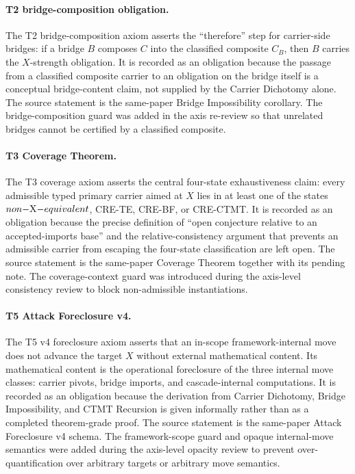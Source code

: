 \documentclass[11pt]{article}
\newcommand{\nonXequiv}{non-$X$-equivalent}
\newcommand{\CRETE}{\textsc{CRE-TE}}
\newcommand{\CREBF}{\textsc{CRE-BF}}
\newcommand{\CRECTMT}{\textsc{CRE-CTMT}}
\theoremstyle{definition}
\begin{document}
\paragraph{T2 bridge-composition obligation.}
The T2 bridge-composition axiom asserts the ``therefore'' step for
carrier-side bridges: if a bridge \(B\) composes \(C\) into the
classified composite \(C_B\), then \(B\) carries the \(X\)-strength
obligation.  It is recorded as an obligation because the passage from
a classified composite carrier to an obligation on the bridge itself
is a conceptual bridge-content claim, not supplied by the Carrier
Dichotomy alone.  The source statement is the same-paper Bridge
Impossibility corollary.  The bridge-composition guard was added in
the axis re-review so that unrelated bridges cannot be certified by a
classified composite.

\paragraph{T3 Coverage Theorem.}
The T3 coverage axiom asserts the central four-state exhaustiveness
claim: every admissible typed primary
carrier aimed at \(X\) lies in at least one of the states
\(\nonXequiv\), \CRETE, \CREBF, or \CRECTMT.  It is recorded as an
obligation because the precise definition of ``open conjecture relative
to an accepted-imports base'' and the relative-consistency argument
that prevents an admissible carrier from escaping the four-state
classification are left open.  The source statement is the same-paper
Coverage Theorem together with its pending note.  The coverage-context
guard was introduced during the axis-level consistency review to block
non-admissible instantiations.

\paragraph{T5 Attack Foreclosure v4.}
The T5 v4 foreclosure axiom asserts that an in-scope framework-internal
move does not advance the
target \(X\) without external mathematical content.  Its mathematical
content is the operational foreclosure of the three internal move
classes: carrier pivots, bridge imports, and cascade-internal
computations.  It is recorded as an obligation because the derivation
from Carrier Dichotomy, Bridge Impossibility, and CTMT Recursion is
given informally rather than as a completed theorem-grade proof.  The
source statement is the same-paper Attack Foreclosure v4 schema.  The
framework-scope guard and opaque internal-move semantics were added
during the axis-level opacity review to prevent over-quantification over
arbitrary targets or arbitrary move semantics.
\end{document}
